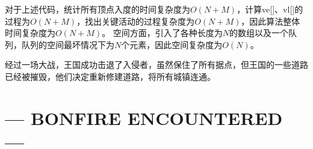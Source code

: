 对于上述代码，统计所有顶点入度的时间复杂度为$O(N+M)$，计算ve[]、vl[]的过程为$O(N+M)$，找出关键活动的过程复杂度为$O(N+M)$，因此算法整体时间复杂度为$O(N+M)$。
空间方面，引入了各种长度为$N$的数组以及一个队列，队列的空间最坏情况下为$N$个元素，因此空间复杂度为$O(N)$。


{\color{red}经过一场大战，王国成功击退了入侵者，虽然保住了所有据点，但王国的一些道路已经被摧毁，他们决定重新修建道路，将所有城镇连通。}


\begingroup
\let\cleardoublepage\clearpage
\chapter*{--- BONFIRE ENCOUNTERED ---}%
\endgroup

